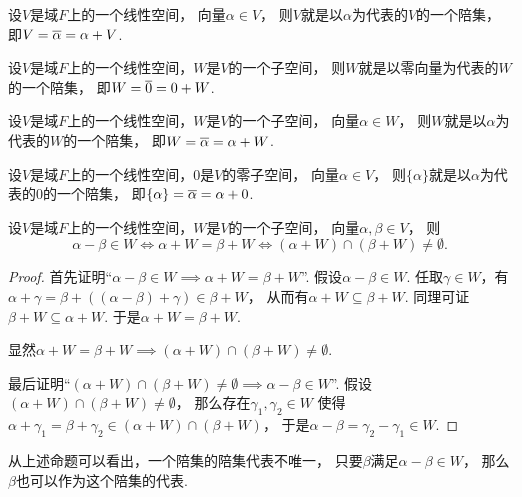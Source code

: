 \begin{proposition}
设\(V\)是域\(F\)上的一个线性空间，
向量\(\alpha \in V\)，
则\(V\)就是以\(\alpha\)为代表的\(V\)的一个陪集，
即\(
	V
	= \EquivalenceClassO{\alpha}
	= \alpha + V
\).
\end{proposition}

\begin{proposition}
设\(V\)是域\(F\)上的一个线性空间，\(W\)是\(V\)的一个子空间，
则\(W\)就是以零向量为代表的\(W\)的一个陪集，
即\(
	W
	= \EquivalenceClassO{0}
	= 0 + W
\).
\end{proposition}

\begin{proposition}
设\(V\)是域\(F\)上的一个线性空间，\(W\)是\(V\)的一个子空间，
向量\(\alpha \in W\)，
则\(W\)就是以\(\alpha\)为代表的\(W\)的一个陪集，
即\(
	W
	= \EquivalenceClassO{\alpha}
	= \alpha + W
\).
\end{proposition}

\begin{proposition}
设\(V\)是域\(F\)上的一个线性空间，\(0\)是\(V\)的零子空间，
向量\(\alpha \in V\)，
则\(\{\alpha\}\)就是以\(\alpha\)为代表的\(0\)的一个陪集，
即\(
	\{\alpha\}
	= \EquivalenceClassO{\alpha}
	= \alpha + 0
\).
\end{proposition}

\begin{proposition}
设\(V\)是域\(F\)上的一个线性空间，\(W\)是\(V\)的一个子空间，
向量\(\alpha,\beta \in V\)，
则\begin{equation*}
	\alpha - \beta \in W
	\iff
	\alpha + W = \beta + W
	\iff
	(\alpha + W) \cap (\beta + W) \neq \emptyset.
\end{equation*}
\begin{proof}
首先证明“\(
	\alpha - \beta \in W
	\implies
	\alpha + W = \beta + W
\)”.
假设\(\alpha - \beta \in W\).
任取\(\gamma \in W\)，有\(
	\alpha + \gamma
	= \beta + ((\alpha - \beta) + \gamma)
	\in \beta + W
\)，
从而有\(\alpha + W \subseteq \beta + W\).
同理可证\(\beta + W \subseteq \alpha + W\).
于是\(\alpha + W = \beta + W\).

显然\(
	\alpha + W = \beta + W
	\implies
	(\alpha + W) \cap (\beta + W) \neq \emptyset
\).

最后证明“\(
	(\alpha + W) \cap (\beta + W) \neq \emptyset
	\implies
	\alpha - \beta \in W
\)”.
假设\((\alpha + W) \cap (\beta + W) \neq \emptyset\)，
那么存在\(\gamma_1,\gamma_2 \in W\)
使得\(\alpha + \gamma_1 = \beta + \gamma_2 \in (\alpha + W) \cap (\beta + W)\)，
于是\(\alpha - \beta = \gamma_2 - \gamma_1 \in W\).
\end{proof}
\end{proposition}
\begin{remark}
从上述命题可以看出，一个陪集的陪集代表不唯一，
只要\(\beta\)满足\(\alpha-\beta \in W\)，
那么\(\beta\)也可以作为这个陪集的代表.
\end{remark}

